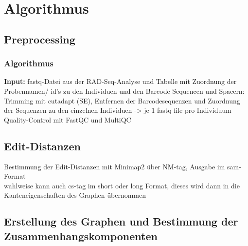 \chapter{Algorithmus} \label{sec:alg}
\section{Preprocessing} \label{sec:}
\subsection{Algorithmus} \label{subsec:}
\textbf{Input:} fastq-Datei aus der RAD-Seq-Analyse und Tabelle mit Zuordnung der Probennamen/-id's zu den Individuen und den Barcode-Sequencen und Spacern: \\
Trimming mit cutadapt (SE), Entfernen der Barcodesequenzen und Zuordnung der Sequenzen zu den einzelnen Individuen -> je 1 fastq file pro Individuum \\
Quality-Control mit FastQC und MultiQC

\section{Edit-Distanzen} \label{sec:edit}
Bestimmung der Edit-Distanzen mit Minimap2 über NM-tag, Ausgabe im sam-Format \\
wahlweise kann auch cs-tag im short oder long Format, dieses wird dann in die Kanteneigenschaften des Graphen übernommen \\

\section{Erstellung des Graphen und Bestimmung der Zusammenhangskomponenten} \label{sec:}
